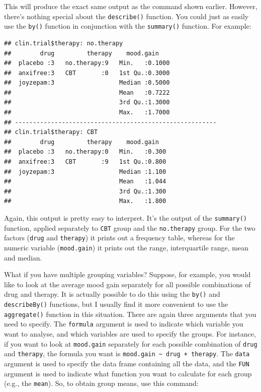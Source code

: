 \documentclass[
]{book}
\newenvironment{Shaded}{\begin{snugshade}}{\end{snugshade}}
\newcommand{\AttributeTok}[1]{\textcolor[rgb]{0.77,0.63,0.00}{#1}}
\newcommand{\FunctionTok}[1]{\textcolor[rgb]{0.00,0.00,0.00}{#1}}
\newcommand{\NormalTok}[1]{#1}
\newcommand{\SpecialCharTok}[1]{\textcolor[rgb]{0.00,0.00,0.00}{#1}}
\begin{document}
This will produce the exact same output as the command shown earlier. However, there's nothing special about the \texttt{describe()} function. You could just as easily use the \texttt{by()} function in conjunction with the \texttt{summary()} function. For example:

\begin{Shaded}
\end{Shaded}

\begin{verbatim}
## clin.trial$therapy: no.therapy
##        drug         therapy    mood.gain     
##  placebo :3   no.therapy:9   Min.   :0.1000  
##  anxifree:3   CBT       :0   1st Qu.:0.3000  
##  joyzepam:3                  Median :0.5000  
##                              Mean   :0.7222  
##                              3rd Qu.:1.3000  
##                              Max.   :1.7000  
## -------------------------------------------------------- 
## clin.trial$therapy: CBT
##        drug         therapy    mood.gain    
##  placebo :3   no.therapy:0   Min.   :0.300  
##  anxifree:3   CBT       :9   1st Qu.:0.800  
##  joyzepam:3                  Median :1.100  
##                              Mean   :1.044  
##                              3rd Qu.:1.300  
##                              Max.   :1.800
\end{verbatim}

Again, this output is pretty easy to interpret. It's the output of the \texttt{summary()} function, applied separately to \texttt{CBT} group and the \texttt{no.therapy} group. For the two factors (\texttt{drug} and \texttt{therapy}) it prints out a frequency table, whereas for the numeric variable (\texttt{mood.gain}) it prints out the range, interquartile range, mean and median.

What if you have multiple grouping variables? Suppose, for example, you would like to look at the average mood gain separately for all possible combinations of drug and therapy. It is actually possible to do this using the \texttt{by()} and \texttt{describeBy()} functions, but I usually find it more convenient to use the \texttt{aggregate()} function in this situation. There are again three arguments that you need to specify. The \texttt{formula} argument is used to indicate which variable you want to analyse, and which variables are used to specify the groups. For instance, if you want to look at \texttt{mood.gain} separately for each possible combination of \texttt{drug} and \texttt{therapy}, the formula you want is \texttt{mood.gain\ \textasciitilde{}\ drug\ +\ therapy}. The \texttt{data} argument is used to specify the data frame containing all the data, and the \texttt{FUN} argument is used to indicate what function you want to calculate for each group (e.g., the \texttt{mean}). So, to obtain group means, use this command:
\end{document}
